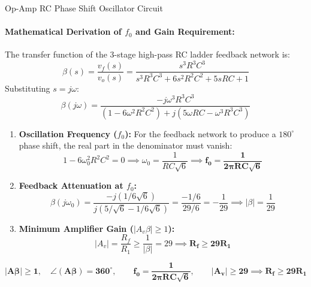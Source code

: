 \documentclass[11pt,a4paper,oneside]{book}
\begin{document}
\begin{schematicbox}{Op-Amp RC Phase Shift Oscillator Circuit}
\end{schematicbox}

\paragraph{Mathematical Derivation of $f_0$ and Gain Requirement:}
The transfer function of the 3-stage high-pass RC ladder feedback network is:
\[
\beta(s) = \frac{v_f(s)}{v_o(s)} = \frac{s^3 R^3 C^3}{s^3 R^3 C^3 + 6s^2 R^2 C^2 + 5sRC + 1}
\]
Substituting $s = j\omega$:
\[
\beta(j\omega) = \frac{-j\omega^3 R^3 C^3}{(1 - 6\omega^2 R^2 C^2) + j(5\omega RC - \omega^3 R^3 C^3)}
\]
\begin{enumerate}[leftmargin=1.5em]
  \item \textbf{Oscillation Frequency ($f_0$):} For the feedback network to produce a $180^\circ$ phase shift, the real part in the denominator must vanish:
  \[
  1 - 6\omega_0^2 R^2 C^2 = 0 \implies \omega_0 = \frac{1}{RC\sqrt{6}} \implies \mathbf{f_0 = \frac{1}{2\pi RC\sqrt{6}}}
  \]
  \item \textbf{Feedback Attenuation at $f_0$:}
  \[
  \beta(j\omega_0) = \frac{-j(1/6\sqrt{6})}{j(5/\sqrt{6} - 1/6\sqrt{6})} = \frac{-1/6}{29/6} = -\frac{1}{29} \implies |\beta| = \frac{1}{29}
  \]
  \item \textbf{Minimum Amplifier Gain ($|A_v \beta| \ge 1$):}
  \[
  |A_v| = \frac{R_f}{R_1} \ge \frac{1}{|\beta|} = 29 \implies \mathbf{R_f \ge 29 R_1}
  \]
\end{enumerate}

\begin{answerbox}
$$\mathbf{|\mathbf{A\beta}| \ge 1, \quad \angle(\mathbf{A\beta}) = 360^\circ, \qquad f_0 = \frac{1}{2\pi RC\sqrt{6}}, \qquad |A_v| \ge 29 \implies R_f \ge 29 R_1}$$
\end{answerbox}

\vspace{0.6cm}
\end{document}
